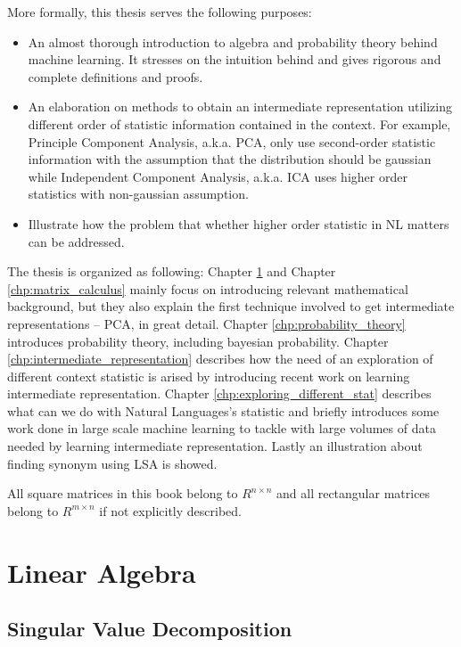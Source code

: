 \documentclass[a4paper]{book}
\begin{document}
  More formally, this thesis serves the following purposes:
  \begin{itemize}
    \item An almost thorough introduction to algebra and probability
      theory behind machine learning. It stresses on the intuition
      behind and gives rigorous and complete definitions and proofs.
    \item An elaboration on methods to obtain an intermediate
      representation utilizing different order of statistic information
      contained in the context. For example, Principle Component
      Analysis, a.k.a. PCA, only use second-order statistic information
      with the assumption that the distribution should be gaussian while
      Independent Component Analysis, a.k.a. ICA uses higher order
      statistics with non-gaussian assumption.
    \item Illustrate how the problem that whether higher order statistic
      in NL matters can be addressed.
  \end{itemize}

  The thesis is organized as following: Chapter \ref{chp:linear_algebra}
  and Chapter \ref{chp:matrix_calculus} mainly focus on introducing
  relevant mathematical background, but they also explain the first
  technique involved to get intermediate representations -- PCA, in
  great detail. Chapter \ref{chp:probability_theory} introduces
  probability theory, including bayesian probability. Chapter
  \ref{chp:intermediate_representation} describes how the need of an
  exploration of different context statistic is arised by introducing
  recent work on learning intermediate representation. Chapter
  \ref{chp:exploring_different_stat} describes what can we do with
  Natural Languages's statistic and briefly introduces some work done in
  large scale machine learning to tackle with large volumes of data
  needed by learning intermediate representation. Lastly an illustration
  about finding synonym using LSA is showed.

  All square matrices in this book belong to $R^{n \times n}$ and all
  rectangular matrices belong to $R^{m \times n}$ if not explicitly
  described.

\chapter{Linear Algebra}
\label{chp:linear_algebra}

  \section{Singular Value Decomposition}
\end{document}
